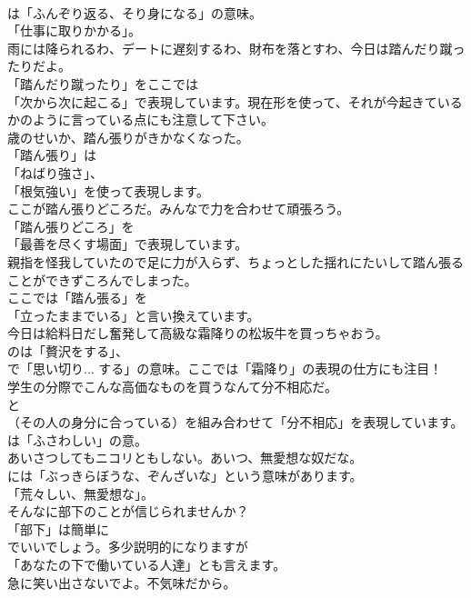 \documentclass[8pt]{extreport}
\begin{document}
\begin{CJK}{UTF8}{min}
\\	は「ふんぞり返る、そり身になる」の意味。
\\	「仕事に取りかかる」。	
\\	雨には降られるわ、デートに遅刻するわ、財布を落とすわ、今日は踏んだり蹴ったりだよ。 
\\	「踏んだり蹴ったり」をここでは
\\	「次から次に起こる」で表現しています。現在形を使って、それが今起きているかのように言っている点にも注意して下さい。	
\\	歳のせいか、踏ん張りがきかなくなった。 
\\	「踏ん張り」は
\\	「ねばり強さ」、
\\	「根気強い」を使って表現します。	
\\	ここが踏ん張りどころだ。みんなで力を合わせて頑張ろう。 
\\	「踏ん張りどころ」を
\\	「最善を尽くす場面」で表現しています。	
\\	親指を怪我していたので足に力が入らず、ちょっとした揺れにたいして踏ん張ることができずころんでしまった。 
\\	ここでは「踏ん張る」を
\\	「立ったままでいる」と言い換えています。	
\\	今日は給料日だし奮発して高級な霜降りの松坂牛を買っちゃおう。 
\\	のは「贅沢をする」、
\\	で「思い切り... する」の意味。ここでは「霜降り」の表現の仕方にも注目！	
\\	学生の分際でこんな高価なものを買うなんて分不相応だ。 
\\	と
\\	（その人の身分に合っている）を組み合わせて「分不相応」を表現しています。
\\	は「ふさわしい」の意。	
\\	あいさつしてもニコリともしない。あいつ、無愛想な奴だな。 
\\	には「ぶっきらぼうな、ぞんざいな」という意味があります。
\\	「荒々しい、無愛想な」。	
\\	そんなに部下のことが信じられませんか？ 
\\	「部下」は簡単に
\\	でいいでしょう。多少説明的になりますが
\\	「あなたの下で働いている人達」とも言えます。	
\\	急に笑い出さないでよ。不気味だから。 

\end{CJK}
\end{document}
